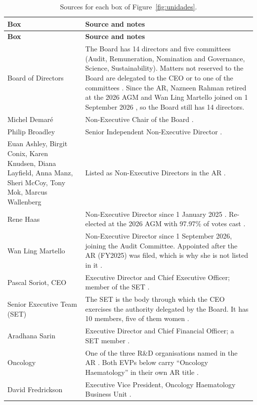 \begin{xltabular}{\linewidth}{@{}>{\raggedright\arraybackslash}p{3.4cm}Y@{}}
\caption{Sources for each box of Figure~\ref{fig:unidades}.}\label{tab:fontes-organograma}\\*
\toprule
\textbf{Box} & \textbf{Source and notes} \\*
\midrule
\endfirsthead
\toprule
\textbf{Box} & \textbf{Source and notes} \\*
\midrule
\endhead
\bottomrule
\endfoot
Board of Directors & The Board has 14 directors and five committees (Audit, Remuneration, Nomination and Governance, Science, Sustainability). Matters not reserved to the Board are delegated to the CEO or to one of the committees \cite[pp.~67--68]{AR}. Since the AR, Nazneen Rahman retired at the 2026 AGM \cite{AGM26} and Wan Ling Martello joined on 1 September 2026 \cite{MART}, so the Board still has 14 directors. \\
Michel Demaré & Non-Executive Chair of the Board \cite[p.~68]{AR}. \\
Philip Broadley & Senior Independent Non-Executive Director \cite[p.~68]{AR}. \\
Euan Ashley, Birgit Conix, Karen Knudsen, Diana Layfield, Anna Manz, Sheri McCoy, Tony Mok, Marcus Wallenberg & Listed as Non-Executive Directors in the AR \cite[pp.~68--69]{AR}. \\
Rene Haas & Non-Executive Director since 1 January 2025 \cite[pp.~68--69]{AR}. Re-elected at the 2026 AGM with 97.97\% of votes cast \cite{AGM26}. \\
Wan Ling Martello & Non-Executive Director since 1 September 2026, joining the Audit Committee. Appointed after the AR (FY2025) was filed, which is why she is not listed in it \cite{MART}. \\
Pascal Soriot, CEO & Executive Director and Chief Executive Officer; member of the SET \cite[pp.~68, 70]{AR}. \\
Senior Executive Team (SET) & The SET is the body through which the CEO exercises the authority delegated by the Board. It has 10 members, five of them women \cite[pp.~39, 70]{AR}. \\
Aradhana Sarin & Executive Director and Chief Financial Officer; a SET member \cite[pp.~68, 70]{AR}. \\
Oncology & One of the three R\&D organisations named in the AR \cite[p.~26]{AR}. Both EVPs below carry ``Oncology Haematology'' in their own AR title \cite[p.~70]{AR}. \\
David Fredrickson & Executive Vice President, Oncology Haematology Business Unit \cite[p.~70]{AR}. \\

\end{xltabular}
